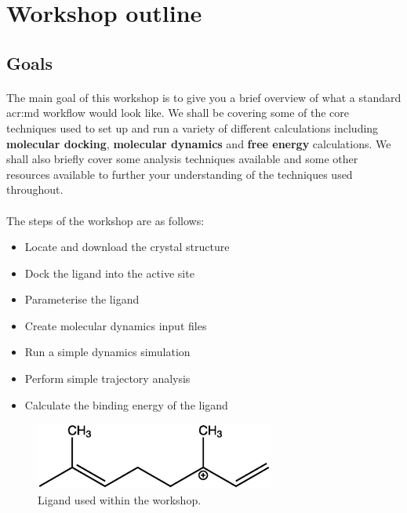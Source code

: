 \section{Workshop outline}
\label{sec:intro}

\subsection{Goals}
    \paragraph{}
    The main goal of this workshop is to give you a brief overview of what a standard \gls{acr:md} workflow would look like. We shall be covering some of the core techniques used to set up and run a variety of different calculations including \textbf{molecular docking}, \textbf{molecular dynamics} and \textbf{free energy} calculations. We shall also briefly cover some analysis techniques available and some other resources available to further your understanding of the techniques used throughout. 

    \paragraph{}
    The steps of the workshop are as follows:
    \begin{itemize}
        \item Locate and download the crystal structure
        \item Dock the ligand into the active site
        \item Parameterise the ligand
        \item Create molecular dynamics input files
        \item Run a simple dynamics simulation
        \item Perform simple trajectory analysis
        \item Calculate the binding energy of the ligand
    \end{itemize}

\begin{figure}[H]
    \centering
    \includegraphics[width=0.7\textwidth]{Graphics/1n20Lig.eps}
    \caption{Ligand used within the workshop.}
    \label{fig:Lig}
\end{figure}

